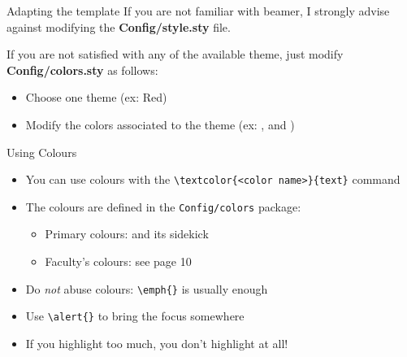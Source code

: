 \begin{frame}{Adapting the template}
    If you are not familiar with beamer, I strongly advise against modifying the \textbf{Config/style.sty} file.
    
    \vspace{\baselineskip}
    
    If you are not satisfied with any of the available theme, just modify \textbf{Config/colors.sty} as follows:
    \begin{itemize}
        \item Choose one theme (ex: Red)
        \item Modify the colors associated to the theme (ex: \testcolor{\useMainColor}, \testcolor{\useBlockTitleColor} and \testcolor{\useBlockMainColor})
    \end{itemize}
\end{frame}



\begin{frame}[fragile]{Using Colours}
\begin{itemize}[<alert@2>]
  \item You can use colours with the
        \verb|\textcolor{<color name>}{text}| command
  \item The colours are defined in the \texttt{Config/colors} package:
  \begin{itemize}
  \item Primary colours:  and its sidekick 
  \item Faculty's colours: see page 10
  \end{itemize}
  \item Do \emph{not} abuse colours: \verb|\emph{}| is usually enough
  \item Use \verb|\alert{}| to bring the \alert<3->{focus} somewhere
  \item <3- | alert@3> If you highlight too much, you don't highlight at all!
\end{itemize}
\end{frame}


